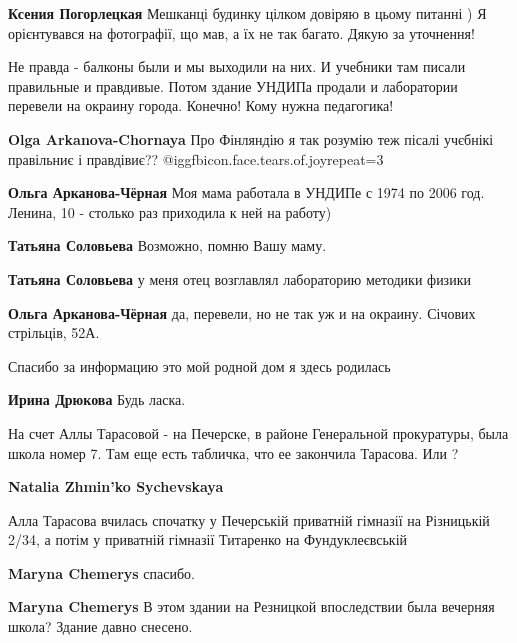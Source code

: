 \begin{itemize}
\begin{itemize}
\begin{itemize}
\textbf{Ксения Погорлецкая} Мешканці будинку цілком довіряю в цьому питанні ) Я орієнтувався на фотографії, що мав, а їх не так багато. Дякую за уточнення!
\end{itemize} %

\end{itemize} %


Не правда - балконы были и мы выходили на них. И учебники там писали правильные
и правдивые. Потом здание УНДИПа продали и лаборатории перевели на окраину
города. Конечно! Кому нужна педагогика!

\begin{itemize} %
\textbf{Olga Arkanova-Chornaya} Про Фінляндію я так розумію теж пісалі учєбнікі правільниє і правдівиє??  @igg{fbicon.face.tears.of.joy}{repeat=3} 

\textbf{Ольга Арканова-Чёрная} Моя мама работала в УНДИПе с 1974 по 2006 год. Ленина, 10 - столько раз приходила к ней на работу)

\textbf{Татьяна Соловьева} Возможно, помню Вашу маму.

\textbf{Татьяна Соловьева} у меня отец возглавлял лабораторию методики физики

\textbf{Ольга Арканова-Чёрная} да, перевели, но не так уж и на окраину. Січових стрільців, 52А.
\end{itemize} %

Спасибо за информацию это мой родной дом я здесь родилась

\textbf{Ирина Дрюкова} Будь ласка.


На счет Аллы Тарасовой - на Печерске, в районе Генеральной прокуратуры, была
школа номер 7. Там еще есть табличка, что ее закончила Тарасова. Или ?

\begin{itemize} %
\textbf{Natalia Zhmin'ko Sychevskaya} 

Алла Тарасова вчилась спочатку у Печерській приватній гімназії на Різницькій
2/34, а потім у приватній гімназії Титаренко на Фундуклеєвській

\textbf{Maryna Chemerys} спасибо.

\textbf{Maryna Chemerys} В этом здании на Резницкой впоследствии была вечерняя школа? Здание давно снесено.


\end{itemize}
\end{itemize}
